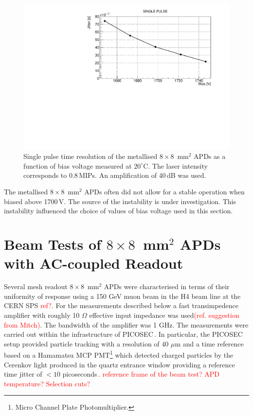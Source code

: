 \documentclass{article}
\begin{document}
\begin{figure}
  \centering
  \includegraphics[width = 0.6 \textwidth]{timeRes8x8metal}
  \caption{Single pulse time resolution of the metallised $8 \times 8$~mm$^2$ APDs as a function of bias voltage measured at $20^\circ$C. The laser intensity corresponds to 0.8\,MIPs. An amplification of 40\,dB was used.}
  \label{fig:timeRes8x8metal}
\end{figure}

The metallised $8 \times 8$~mm$^2$ APDs often did not allow for a stable operation when biased above 1700\,V.
The source of the instability is under investigation.
This instability influenced the choice of values of bias voltage used in this section.

\section{Beam Tests of $8 \times 8$~mm$^2$ APDs with AC-coupled Readout}
\label{sec:tb8x8}

Several mesh readout $8 \times 8$~mm$^2$ APDs were characterised in terms of their uniformity of response using a 150 GeV muon beam in the H4 beam line at the CERN SPS \textcolor{red}{ref?}.
For the measurements described below a fast transimpedence amplifier with roughly 10 $\Omega$ effective input impedance was used\textcolor{red}{(ref. suggestion from Mitch)}.
The bandwidth of the amplifier was 1 GHz.
The measurements were carried out within the infrastructure of PICOSEC\,\cite{bortfeld2018}.
In particular, the PICOSEC setup provided particle tracking with a resolution of 40 $\mu$m and a time reference based on a Hamamatsu MCP PMT\footnote{Micro Channel Plate Photomultiplier.} which detected charged particles by the Cerenkov light produced in the quartz entrance window providing a reference time jitter of $<10$ picoseconds\,\cite{sohl2018}.
\textcolor{red}{reference frame of the beam test? APD temperature?  Selection cuts?}
\end{document}
